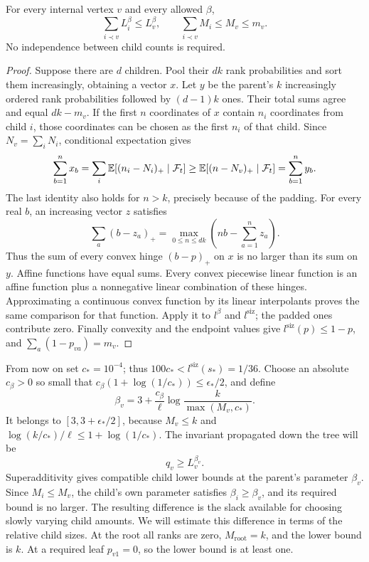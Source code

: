\begin{lemma}[Superadditivity]\label{lem:superadditivity}
For every internal vertex $v$ and every allowed $\beta$,
\begin{equation}\label{eq:rank-superadditivity}
 \sum_{i\prec v}L_i^\beta\le L_v^\beta,\qquad
 \sum_{i\prec v}M_i\le M_v\le m_v.
\end{equation}
No independence between child counts is required.
\end{lemma}

\begin{proof}
Suppose there are $d$ children.  Pool their $dk$ rank probabilities
and sort them increasingly, obtaining a vector $x$.
Let $y$ be the parent's $k$ increasingly ordered rank probabilities
followed by $(d-1)k$ ones.  Their total sums agree and equal $dk-m_v$.
If the first $n$ coordinates of $x$ contain $n_i$ coordinates from child
$i$, those coordinates can be chosen as the first $n_i$ of that child.
Since $N_v=\sum_iN_i$, conditional expectation gives
\[
 \sum_{b=1}^n x_b
 =\sum_i\mathbb E[(n_i-N_i)_+\mid\mathcal F_t]
 \ge\mathbb E[(n-N_v)_+\mid\mathcal F_t]
 =\sum_{b=1}^n y_b.
\]
The last identity also holds for $n>k$, precisely because of the padding.
For every real $b$, an increasing vector $z$ satisfies
\[
       \sum_a(b-z_a)_+
       =\max_{0\le n\le dk}\left(nb-\sum_{a=1}^n z_a\right).
\]
Thus the sum of every convex hinge $(b-p)_+$ on $x$ is no larger
than its sum on $y$.  Affine functions have equal sums.  Every convex
piecewise linear function is an affine function plus a nonnegative
linear combination of these hinges.  Approximating a continuous convex
function by its linear interpolants proves the same comparison for
that function.  Apply it to $l^\beta$ and $l^{\mathrm{siz}}$;
the padded ones contribute zero.  Finally convexity and the endpoint
values give $l^{\mathrm{siz}}(p)\le1-p$, and
$\sum_a(1-p_{va})=m_v$.
\end{proof}

From now on set $c_*=10^{-4}$; thus
$100c_*<l^{\mathrm{siz}}(s_*)=1/36$.  Choose an absolute $c_\beta>0$
so small that
$c_\beta(1+\log(1/c_*))\le\epsilon_*/2$, and define
\begin{equation}\label{eq:vertex-beta}
 \beta_v=3+\frac{c_\beta}{\ell}
                \log\frac{k}{\max(M_v,c_*)}.
\end{equation}
It belongs to $[3,3+\epsilon_*/2]$, because $M_v\le k$ and
$\log(k/c_*)/\ell\le1+\log(1/c_*)$.
The invariant propagated down the tree will be
\begin{equation}\label{eq:allocation-lower-bound}
                         q_v\ge L_v^{\beta_v}.
\end{equation}
Superadditivity gives compatible child lower bounds at the parent's
parameter $\beta_v$.  Since $M_i\le M_v$, the child's own parameter
satisfies $\beta_i\ge\beta_v$, and its required bound is no larger.
The resulting difference is the slack available for choosing slowly
varying child amounts.  We will estimate this difference in terms of
the relative child sizes.
At the root all ranks are zero, $M_{\mathrm{root}}=k$, and the lower
bound is $k$.  At a required leaf $p_{v1}=0$, so the lower bound is
at least one.

